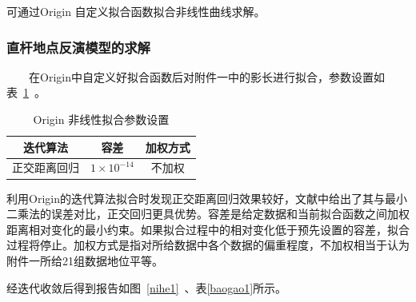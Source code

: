 \documentclass[12pt]{cumcmart}   %
\begin{document}
可通过Origin 自定义拟合函数拟合非线性曲线求解。

\subsubsection{直杆地点反演模型的求解}  
$\qquad$在Origin中自定义好拟合函数后对附件一中的影长进行拟合，参数设置如表~\ref{canshu1}~。
\begin{table}[!htbp]
	\centering
	\caption{Origin 非线性拟合参数设置}\label{canshu1}
	\begin{tabular}{ccc}
		\toprule[1.5pt]
		迭代算法& 容差 &加权方式\\
		\midrule[1pt]
        正交距离回归&$1 \times 10^{-14}$ &不加权\\
		\bottomrule[1.5pt]
	\end{tabular}
\end{table}
利用Origin的迭代算法拟合时发现正交距离回归效果较好，文献中给出了其与最小二乘法的误差对比，正交回归更具优势。容差是给定数据和当前拟合函数之间加权距离相对变化的最小约束。如果拟合过程中的相对变化低于预先设置的容差，拟合过程将停止。加权方式是指对所给数据中各个数据的偏重程度，不加权相当于认为附件一所给21组数据地位平等。

经迭代收敛后得到报告如图~\ref{nihe1}~、表\ref{baogao1}所示。
\end{document}
